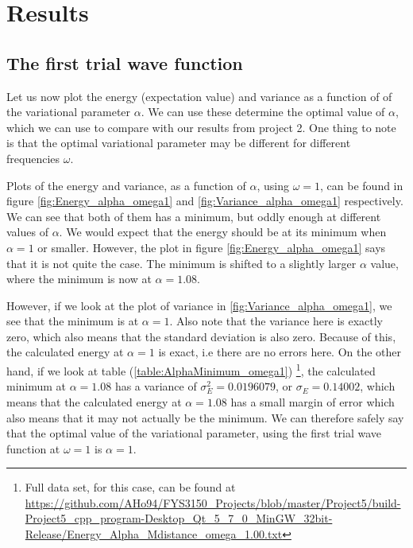 \documentclass[12pt]{article}
\begin{document}
\section{Results}\label{section:results}
\subsection{The first trial wave function}

Let us now plot the energy (expectation value) and variance as a function of of the variational parameter $\alpha$. We can use these determine the optimal value of $\alpha$, which we can use to compare with our results from project 2. One thing to note is that the optimal variational parameter may be different for different frequencies $\omega$.

Plots of the energy and variance, as a function of $\alpha$, using $\omega = 1$, can be found in figure \ref{fig:Energy_alpha_omega1} and \ref{fig:Variance_alpha_omega1} respectively. We can see that both of them has a minimum, but oddly enough at different values of $\alpha$. We would expect that the energy should be at its minimum when $\alpha = 1$ or smaller. However, the plot in figure \ref{fig:Energy_alpha_omega1} says that it is not quite the case. The minimum is shifted to a slightly larger $\alpha$ value, where the minimum is now at $\alpha = 1.08$.

However, if we look at the plot of variance in \ref{fig:Variance_alpha_omega1}, we see that the minimum is at $\alpha = 1$. Also note that the variance here is exactly zero, which also means that the standard deviation is also zero. Because of this, the calculated energy at $\alpha = 1$ is exact, i.e there are no errors here. On the other hand, if we look at table (\ref{table:AlphaMinimum_omega1}) \footnote{Full data set, for this case, can be found at \url{https://github.com/AHo94/FYS3150_Projects/blob/master/Project5/build-Project5_cpp_program-Desktop_Qt_5_7_0_MinGW_32bit-Release/Energy_Alpha_Mdistance_omega_1.00.txt}}, the calculated minimum at $\alpha=1.08$ has a variance of $\sigma_E^2 = 0.0196079$, or $\sigma_E = 0.14002$, which means that the calculated energy at $\alpha = 1.08$ has a small margin of error which also means that it may not actually be the minimum. We can therefore safely say that the optimal value of the variational parameter, using the first trial wave function at $\omega = 1$ is $\alpha = 1$.
\end{document}
